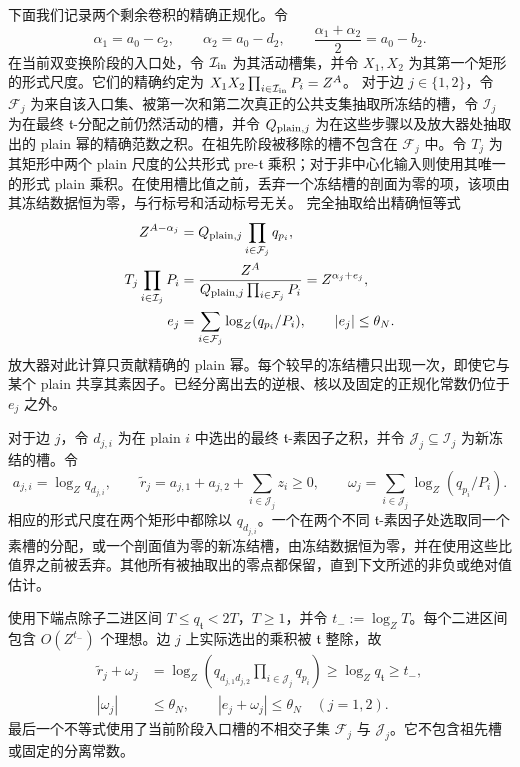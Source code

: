下面我们记录两个剩余卷积的精确正规化。令
\[
 \alpha_1=a_0-c_2,\qquad \alpha_2=a_0-d_2,\qquad
 \frac{\alpha_1+\alpha_2}{2}=a_0-b_2.
\]
在当前双变换阶段的入口处，令 \(\mathcal I_{\rm in}\) 为其活动槽集，并令 \(X_1,X_2\) 为其第一个矩形的形式尺度。它们的精确约定为 \(X_1X_2\prod_{i\in\mathcal I_{\rm in}}P_i=Z^A\)。
对于边 \(j\in\{1,2\}\)，令 \(\mathcal F_j\) 为来自该入口集、被第一次和第二次真正的公共支集抽取所冻结的槽，令 \(\mathcal I_j\) 为在最终 \(\mathfrak t\)-分配之前仍然活动的槽，并令 \(Q_{{\rm plain},j}\) 为在这些步骤以及放大器处抽取出的 plain 幂的精确范数之积。在祖先阶段被移除的槽不包含在 \(\mathcal F_j\) 中。令 \(T_j\) 为其矩形中两个 plain 尺度的公共形式 pre-\(\mathfrak t\) 乘积；对于非中心化输入则使用其唯一的形式 plain 乘积。在使用槽比值之前，丢弃一个冻结槽的剖面为零的项，该项由其冻结数据恒为零，与行标号和活动标号无关。
完全抽取给出精确恒等式
\[
 \begin{aligned}
 Z^{A-\alpha_j}
   &=Q_{{\rm plain},j}\prod_{i\in\mathcal F_j}q_{p_i},\\
 T_j\prod_{i\in\mathcal I_j}P_i
   &=\frac{Z^A}{Q_{{\rm plain},j}\prod_{i\in\mathcal F_j}P_i}
     =Z^{\alpha_j+e_j},\\
 e_j&=\sum_{i\in\mathcal F_j}\log_Z(q_{p_i}/P_i),
 \qquad |e_j|\le\theta_N.
 \end{aligned}
\]
放大器对此计算只贡献精确的 plain 幂。每个较早的冻结槽只出现一次，即使它与某个 plain 共享其素因子。已经分离出去的逆根、核以及固定的正规化常数仍位于 \(e_j\) 之外。

对于边 \(j\)，令 \(d_{j,i}\) 为在 plain \(i\) 中选出的最终 \(\mathfrak t\)-素因子之积，并令 \(\mathcal J_j\subseteq\mathcal I_j\) 为新冻结的槽。令
\[
 a_{j,i}=\log_Zq_{d_{j,i}},\qquad
 \widetilde r_j=a_{j,1}+a_{j,2}+\sum_{i\in\mathcal J_j}z_i\ge0,
 \qquad
 \omega_j=\sum_{i\in\mathcal J_j}\log_Z(q_{p_i}/P_i).
\]
相应的形式尺度在两个矩形中都除以 \(q_{d_{j,i}}\)。一个在两个不同 \(\mathfrak t\)-素因子处选取同一个素槽的分配，或一个剖面值为零的新冻结槽，由冻结数据恒为零，并在使用这些比值界之前被丢弃。其他所有被抽取出的零点都保留，直到下文所述的非负或绝对值估计。

使用下端点除子二进区间 \(T\le q_{\mathfrak t}<2T\)，\(T\ge1\)，并令 \(t_-:=\log_ZT\)。每个二进区间包含 \(O(Z^{t_-})\) 个理想。边 \(j\) 上实际选出的乘积被 \(\mathfrak t\) 整除，故
\begin{equation}
 \begin{aligned}
 \widetilde r_j+\omega_j
 &=\log_Z\left(q_{d_{j,1}d_{j,2}}
                  \prod_{i\in\mathcal J_j}q_{p_i}\right)
 \ge\log_Zq_{\mathfrak t}\ge t_-,\\
 |\omega_j|&\le\theta_N,\qquad |e_j+\omega_j|\le\theta_N
 \quad(j=1,2).
 \end{aligned}
 \label{eq:centered-divisor-boundary}
\end{equation}
最后一个不等式使用了当前阶段入口槽的不相交子集 \(\mathcal F_j\) 与 \(\mathcal J_j\)。它不包含祖先槽或固定的分离常数。

